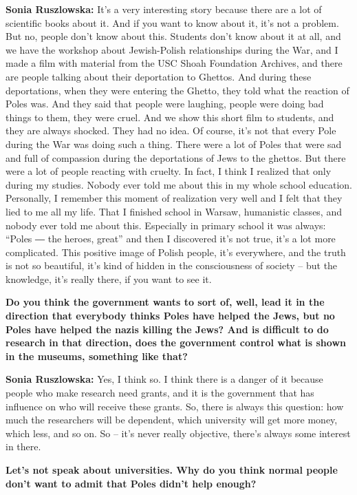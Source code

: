 \textbf{Sonia Ruszlowska:} It’s a very interesting story because there are a lot of scientific books about it. And if you want to know about it, it’s not a problem. But no, people don’t know about this. Students don’t know about it at all, and we have the workshop about Jewish-Polish relationships during the War, and I made a film with material from the USC Shoah Foundation Archives, and there are people talking about their deportation to Ghettos. And during these deportations, when they were entering the Ghetto, they told what the reaction of Poles was. And they said that people were laughing, people were doing bad things to them, they were cruel. And we show this short film to students, and they are always shocked. They had no idea. Of course, it’s not that every Pole during the War was doing such a thing. There were a lot of Poles that were sad and full of compassion during the deportations of Jews to the ghettos. But there were a lot of people reacting with cruelty. In fact, I think I realized that only during my studies. Nobody ever told me about this in my whole school education. Personally, I remember this moment of realization very well and I felt that they lied to me all my life. That I finished school in Warsaw, humanistic classes, and nobody ever told me about this. Especially in primary school it was always: ``Poles ― the heroes, great'' and then I discovered it’s not true, it’s a lot more complicated. This positive image of Polish people, it’s everywhere, and the truth is not so beautiful, it’s kind of hidden in the consciousness of society – but the knowledge, it’s really there, if you want to see it. 

\textbf{Do you think the government wants to sort of, well, lead it in the direction that everybody thinks Poles have helped the Jews, but no Poles have helped the nazis killing the Jews? And is difficult to do research in that direction, does the government control what is shown in the museums, something like that?} 

\textbf{Sonia Ruszlowska:} Yes, I think so. I think there is a danger of it because people who make research need grants, and it is the government that has influence on who will receive these grants. So, there is always this question: how much the researchers will be dependent, which university will get more money, which less, and so on. So – it’s never really objective, there’s always some interest in there. 

\textbf{Let’s not speak about universities. Why do you think normal people don’t want to admit that Poles didn’t help enough?} 

